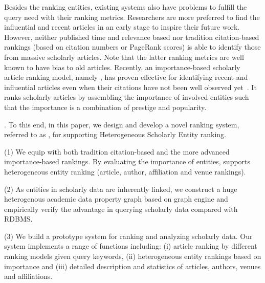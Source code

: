 Besides the ranking entities, existing systems also have problems to fulfill the query need with their ranking metrics.
Researchers are more preferred to find the influential and recent articles in an early stage to inspire their future work.
However, neither published time and relevance based nor tradition citation-based rankings (\eg based on citation numbers or PageRank scores) is able to identify those from massive scholarly articles. Note that the latter ranking metrics are well known to have bias to old articles.
%
Recently, an importance-based scholarly article ranking model, namely \sarank, has proven effective for identifying recent and influential articles even when their citations have not been well observed yet~\cite{ma2018query}. It ranks scholarly articles by assembling the importance of involved entities such that the importance is a combination of prestige and popularity. %





.
To this end, in this paper, we design and develop a novel ranking system, referred to as \oursystem, for supporting Heterogeneous Scholarly Entity
ranking.

\noindent (1) We equip \oursystem with both tradition citation-based and the more advanced importance-based rankings. By evaluating the importance of entities, \oursystem supports heterogeneous entity ranking (\ie article, author, affiliation and venue rankings).


\noindent (2) As entities in scholarly data are inherently linked, we construct a huge heterogenous academic data property graph based on graph engine and empirically verify the advantage in querying scholarly data compared with RDBMS.

\noindent (3) We build a prototype system for ranking and analyzing scholarly data. Our system implements a range of functions including: (i) article ranking by different ranking models given query keywords, (ii) heterogeneous entity rankings based on importance and (iii) detailed description and statistics of articles, authors, venues and affiliations.


